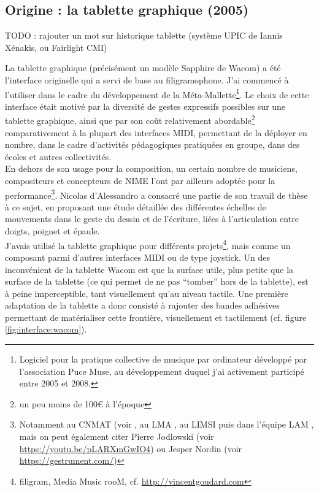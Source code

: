 \subsection{Origine : la tablette graphique (2005)}

TODO : rajouter un mot sur historique tablette (système UPIC de Iannis Xénakis, ou Fairlight CMI)

\noindent La tablette graphique (précisément un modèle Sapphire de Wacom) a été l’interface originelle qui a servi de base au filigramophone. J’ai commencé à l’utiliser dans le cadre du développement de la Méta-Mallette\footnote{Logiciel pour la pratique collective de musique par ordinateur développé par l’association Puce Muse, au développement duquel j'ai activement participé entre 2005 et 2008.}. Le choix de cette interface était motivé par la diversité de gestes expressifs possibles sur une tablette graphique, ainsi que par son coût relativement abordable\footnote{un peu moins de 100€ à l'époque} comparativement à la plupart des interfaces \gls{MIDI}, permettant de la déployer en nombre, dans le cadre d'activités pédagogiques pratiquées en groupe, dans des écoles et autres collectivités.\\
\indent En dehors de son usage pour la composition, un certain nombre de musiciens, compositeurs et concepteurs de \gls{NIME} l’ont par ailleurs adoptée pour la performance\footnote{Notamment au \gls{CNMAT} (voir \cite{zbyszynski_ten_2007}, au \gls{LMA} \cite{couturier_utilisation_2004}, au \gls{LIMSI} \cite{feugere_chorus_2011} puis dans l'équipe \gls{LAM} \cite{xiao_t-voks_2019}, mais on peut également citer Pierre Jodlowski (voir \url{https://youtu.be/pLARXmGwIO4}) ou Jesper Nordin (voir \url{https://gestrument.com/})}. Nicolas d’Alessandro a consacré une partie de son travail de thèse \cite{dalessandro_realtime_2009} à ce sujet, en proposant une étude détaillée des différentes échelles de mouvements dans le geste du dessin et de l'écriture, liées à l'articulation entre doigts, poignet et épaule.\\
\indent J'avais utilisé la tablette graphique pour différents projets\footnote{filigram, Media Music rooM, cf. \url{http://vincentgoudard.com}}, mais comme un composant parmi d'autres interfaces \gls{MIDI} ou de type joystick.
\indent Un des inconvénient de la tablette Wacom est que la surface utile, plus petite que la surface de la tablette (ce qui permet de ne pas ``tomber'' hors de la tablette), est à peine imperceptible, tant visuellement qu'au niveau tactile. Une première adaptation de la tablette a donc consisté à rajouter des bandes adhésives permettant de matérialiser cette frontière, visuellement et tactilement (cf. figure \ref{fig:interface:wacom}).\\

